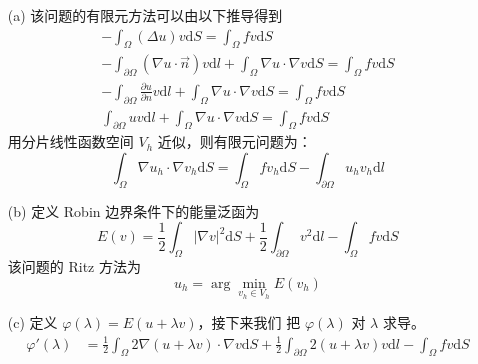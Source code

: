 \documentclass[a4paper]{article}
\begin{document}
\begin{enumerate}
    \item[(a)] 该问题的有限元方法可以由以下推导得到
    \begin{equation}
        \begin{gathered}
            -\int_{\Omega} (\Delta u) v \text{d}S = \int_{\Omega} f v \text{d}S\\
            -\int_{\partial\Omega} (\nabla u \cdot \vec{n}) v \text{d}l
            + \int_{\Omega} \nabla u \cdot \nabla v \text{d}S
            =\int_{\Omega} f v \text{d}S\\
            -\int_{\partial\Omega} \frac{\partial u}{\partial n} v \text{d}l
            + \int_{\Omega} \nabla u \cdot \nabla v \text{d}S
            =\int_{\Omega} f v \text{d}S\\
            \int_{\partial\Omega} u v \text{d}l
            + \int_{\Omega} \nabla u \cdot \nabla v \text{d}S
            =\int_{\Omega} f v \text{d}S
        \end{gathered}
    \end{equation}
    用分片线性函数空间 $V_h$ 近似，则有限元问题为：
    \begin{equation}
        \int_{\Omega} \nabla u_h \cdot \nabla v_h \text{d}S
            =\int_{\Omega} f v_h \text{d}S
            - \int_{\partial\Omega} u_h v_h \text{d}l 
    \end{equation}
    \item[(b)] 定义 Robin 边界条件下的能量泛函为
    \begin{equation}
        E(v) = \frac{1}{2} \int_{\Omega} |\nabla v|^2 \text{d}S
            + \frac{1}{2} \int_{\partial\Omega} v^2 \text{d}l
            - \int_{\Omega} f v \text{d}S
    \end{equation}
    该问题的 Ritz 方法为
    \begin{equation}
        u_h = \arg \min_{v_h \in V_h} E(v_h)
    \end{equation}
    \item[(c)] 定义 $\varphi(\lambda) = E(u + \lambda v)$，接下来我们
                把 $\varphi(\lambda)$ 对 $\lambda$ 求导。
            \begin{equation}
                \begin{aligned}
                    \varphi'(\lambda)
                    &= \frac{1}{2} \int_{\Omega} 2\nabla (u + \lambda v) \cdot \nabla v \text{d}S
                        + \frac{1}{2} \int_{\partial\Omega} 2(u + \lambda v)v \text{d}l
                        - \int_{\Omega} f v \text{d}S\\

\end{aligned}
\end{equation}
\end{enumerate}
\end{document}
